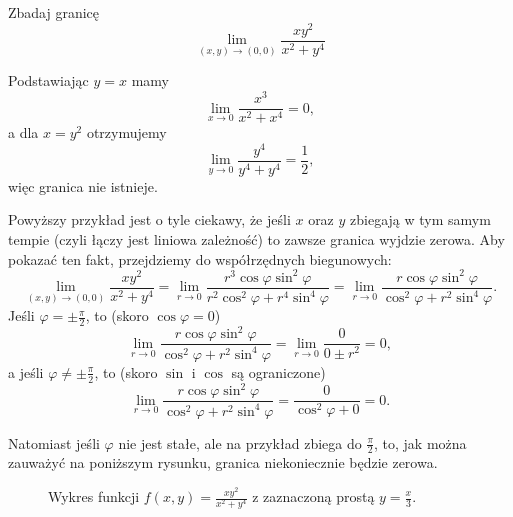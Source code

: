 \begin{example}
    Zbadaj granicę
    \[ \lim_{(x, y)\to (0, 0)} \frac{xy^2}{x^2 + y^4} \]
\end{example}
\begin{solution}
    Podstawiając $y = x$ mamy
    \[ \lim_{x\to 0} \frac{x^3}{x^2 + x^4} = 0, \]
    a dla $x = y^2$ otrzymujemy
    \[ \lim_{y\to 0} \frac{y^4}{y^4 + y^4} = \frac{1}{2}, \]
    więc granica nie istnieje.
\end{solution}

\begin{remark*}
    Powyższy przykład jest o tyle ciekawy, że jeśli $x$ oraz $y$ zbiegają w tym samym tempie (czyli łączy jest liniowa zależność) to zawsze granica wyjdzie zerowa. Aby pokazać ten fakt, przejdziemy do współrzędnych biegunowych:
    \[ \lim_{(x, y)\to (0, 0)} \frac{xy^2}{x^2 + y^4}  = \lim_{r\to 0} \frac{r^3 \cos\varphi\sin^2\varphi}{r^2\cos^2\varphi + r^4\sin^4\varphi} = \lim_{r\to 0} \frac{r \cos\varphi\sin^2\varphi}{\cos^2\varphi + r^2\sin^4\varphi}. \]
    Jeśli $\varphi = \pm\frac{\pi}{2}$, to (skoro $\cos\varphi = 0$)
    \[ \lim_{r\to 0} \frac{r \cos\varphi\sin^2\varphi}{\cos^2\varphi + r^2\sin^4\varphi} = \lim_{r\to 0} \frac{0}{0 \pm r^2} = 0, \]
    a jeśli $\varphi \neq \pm\frac{\pi}{2}$, to (skoro $\sin$ i $\cos$ są ograniczone)
    \[ \lim_{r\to 0} \frac{r \cos\varphi\sin^2\varphi}{\cos^2\varphi + r^2\sin^4\varphi} = \frac{0}{\cos^2\varphi + 0} = 0. \]

    Natomiast jeśli $\varphi$ nie jest stałe, ale na przykład zbiega do $\frac{\pi}{2}$, to, jak można zauważyć na poniższym rysunku, granica niekoniecznie będzie zerowa.
\end{remark*}

\begin{figure}[H]
    \centering
    \caption[short]{Wykres funkcji $f(x, y) = \frac{xy^2}{x^2 + y^4}$ z zaznaczoną prostą $y = \frac{x}{3}$.}
\end{figure}

